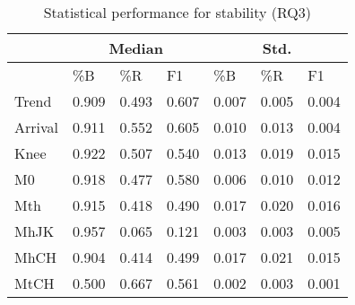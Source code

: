 \begin{table}[htb]
\scriptsize
\caption{Statistical performance for stability (RQ3)}
\label{tab:mean-stable}
\centering
\begin{tabular}{p{1.2cm}|p{0.8cm}p{0.8cm}p{0.8cm}|p{0.8cm}p{0.8cm}p{0.8cm}}
\hline
& \multicolumn{3}{c|}{Median} & \multicolumn{3}{c}{Std.} \\
\hline
 &  \%B & \%R & F1 & \%B & \%R & F1  \\
\hline
Trend & 0.909 &	0.493 &	0.607 & 0.007 &	0.005 & 0.004 \\
Arrival & 0.911 & 0.552 & 0.605 & 0.010 & 0.013 & 0.004 \\
Knee & 0.922 &	0.507 & 0.540 & 0.013 &	0.019 & 0.015 \\
M0 & 0.918 & 0.477 & 0.580 & 0.006 & 0.010 & 0.012 \\
Mth & 0.915 & 0.418 & 0.490 & 0.017 & 0.020 &	0.016 \\
MhJK & 0.957 &	0.065 &	0.121 & 0.003 &	0.003 & 0.005 \\
MhCH & 0.904 &	0.414 &	0.499 & 0.017 &	0.021 &	0.015 \\
MtCH & 0.500 &	0.667 &	0.561 & 0.002 & 0.003 &	0.001 \\
\hline
\end{tabular}
\end{table}


